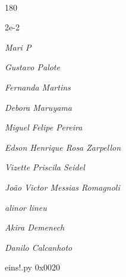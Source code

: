 \documentclass[12pt]{article}
\begin{document}
		  

\pagebreak			

	\ 
	\vfill
	\begin{turn}{180}	
		\begin{minipage}{\textwidth}
		  	\ttfamily %
			\centering
			{\Huge 2e-2}
		  
			\hfill
		  
			

\textit{\small Mari P}

\textit{\small Gustavo Palote}

\textit{\small Fernanda Martins}

\textit{\small Debora Maruyama}

\textit{\small Miguel Felipe Pereira}

\textit{\small Edson Henrique Rosa Zarpellon}

\textit{\small Vizette Priscila Seidel}

\textit{\small João Victor Messias Romagnoli}

\textit{\small alinor lineu}

\textit{\small Akira Demenech}

\textit{\small Danilo Calcanhoto}

\bigskip

eins!.py
0x0020


		\end{minipage}	
	\end{turn}
	\vfill
	\

\pagebreak
\end{document}
